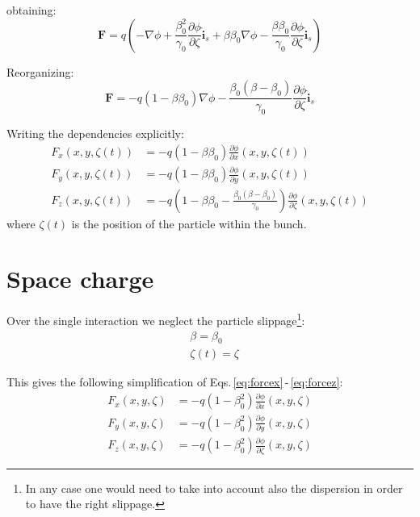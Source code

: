 obtaining:
\begin{equation}
\textbf{F} 
=q \left( -\nabla \phi +\frac{\beta_0^2}{\gamma_0}\frac{\partial \phi}{\partial \zeta}\hat{\textbf{i}}_s
 + \beta  \beta_0\nabla \phi - \frac{\beta \beta_0}{\gamma_0} \frac{\partial \phi}{\partial \zeta} \hat{\textbf{i}}_s
  \right)
\end{equation}


Reorganizing:
\begin{equation}
\textbf{F} 
=  -q(1-\beta  \beta_0)\nabla \phi -\frac{\beta_0(\beta-\beta_0)}{\gamma_0}\frac{\partial \phi}{\partial \zeta}\hat{\textbf{i}}_s
\end{equation}

Writing the dependencies explicitly:
\begin{align}
F_x(x, y, \zeta(t)) &=  -q(1-\beta  \beta_0) \frac{\partial \phi}{\partial x}(x, y, \zeta(t))\label{eq:forcex}\\
F_y(x, y, \zeta(t)) &=  -q(1-\beta  \beta_0) \frac{\partial \phi}{\partial y}(x, y, \zeta(t))\label{eq:forcey}\\
F_z(x, y, \zeta(t)) &=  -q\left(1-\beta  \beta_0 -\frac{\beta_0(\beta-\beta_0)}{\gamma_0}\right) \frac{\partial \phi}{\partial \zeta}(x, y, \zeta(t))\label{eq:forcez}
\end{align}
where $\zeta(t)$ is the position of the particle within the bunch.

\section{Space charge}

Over the single interaction we neglect the particle slippage\footnote{In any case one would need to take into account also the dispersion in order to have the right slippage.}:
\begin{align}
&\beta = \beta_0\\
&\zeta(t) = \zeta
\end{align}

This gives the following simplification of Eqs.\,\eqref{eq:forcex}\,-\,\eqref{eq:forcez}:
\begin{align}
F_x(x, y, \zeta) &=  -q(1-\beta_0^2) \frac{\partial \phi}{\partial x}(x, y, \zeta)\\
F_y(x, y, \zeta) &=  -q(1-\beta_0^2) \frac{\partial \phi}{\partial y}(x, y, \zeta)\\
F_z(x, y, \zeta) &=  -q (1-\beta_0^2) \frac{\partial \phi}{\partial \zeta}(x, y, \zeta)
\end{align}

